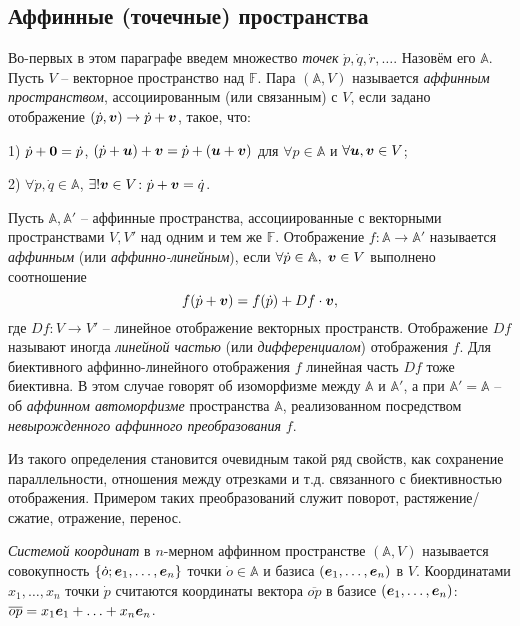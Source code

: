 \subsection{Аффинные (точечные) пространства}

Во-первых в этом параграфе введем множество \textit{точек} $\dot p, \dot q, \dot r, \ldots$. Назовём его $\mathbb{A}$. Пусть $V$ -- векторное пространство над $\mathbb{F}$. Пара $(\mathbb{A}, V)$  называется \textit{аффинным пространством}, ассоциированным (или связанным) с $V$, если задано отображение $(\dot p, \mbox{\boldmath $v$}) \to \dot p + \mbox{\boldmath $v$}$, такое, что:

1) $\dot p + \mbox{\boldmath $0$} = \dot p$, $(\dot p + \mbox{\boldmath $u$}) + \mbox{\boldmath $v$} = \dot p + (\mbox{\boldmath $u$} + \mbox{\boldmath $v$})$ для $\forall p \in \mathbb{A}$ и $\forall \mbox{\boldmath $u$}, \mbox{\boldmath $v$} \in V$;

2) $\forall \dot p, \dot q \in \mathbb{A}$, $\exists ! \mbox{\boldmath $v$} \in V \colon \dot p + \mbox{\boldmath $v$} = \dot q$.


\begin{to_def} 
    Пусть $\mathbb{A}, \mathbb{A}'$  -- аффинные пространства, ассоциированные с векторными пространствами $V, V'$ над одним и тем же $\mathbb{F}$. Отображение $f \colon \mathbb{A} \to \mathbb{A}'$ называется \textit{аффинным} (или \textit{аффинно-линейным}), если $\forall \dot p \in \mathbb{A}, \; \mbox{\boldmath $v$} \in V$ выполнено соотношение 
    \begin{equation}
        f(\dot p + \mbox{\boldmath $v$}) = f(\dot p) + D f \cdot \mbox{\boldmath $v$},
    \end{equation}
    где $Df \colon V \to V'$ -- линейное отображение векторных пространств. Отображение $Df$ называют иногда \textit{линейной частью} (или \textit{дифференциалом}) отображения $f$. Для биективного аффинно-линейного отображения $f$ линейная часть $Df$ тоже биективна. В этом случае говорят об изоморфизме между $\mathbb{A}$ и $\mathbb{A}'$, а при $\mathbb{A}' = \mathbb{A}$ -- об \textit{аффинном автоморфизме} пространства $\mathbb{A}$, реализованном посредством \textit{невырожденного аффинного преобразования} $f$.
\end{to_def}

Из такого определения становится очевидным такой ряд свойств, как сохранение параллельности, отношения между отрезками и т.д. связанного с биективностью отображения. Примером таких преобразований служит поворот, растяжение/сжатие, отражение, перенос.

\begin{to_def} 
    \textit{Системой координат} в $n$-мерном аффинном пространстве $(\mathbb{A}, V) $ называется совокупность $\{\dot o; \mbox{\boldmath $e$}_1, \ldots, \mbox{\boldmath $e$}_n\}$ точки $\dot o \in \mathbb{A}$  и базиса $(\mbox{\boldmath $e$}_1, \ldots, \mbox{\boldmath $e$}_n)$ в $V$. Координатами $x_1, \ldots, x_n$ точки $\dot p$ считаются координаты вектора $\overline{op}$ в базисе $(\mbox{\boldmath $e$}_1, \ldots, \mbox{\boldmath $e$}_n)$: $\overline{op} = x_1 \mbox{\boldmath $e$}_1 + \ldots + x_n \mbox{\boldmath $e$}_n$.
\end{to_def}

